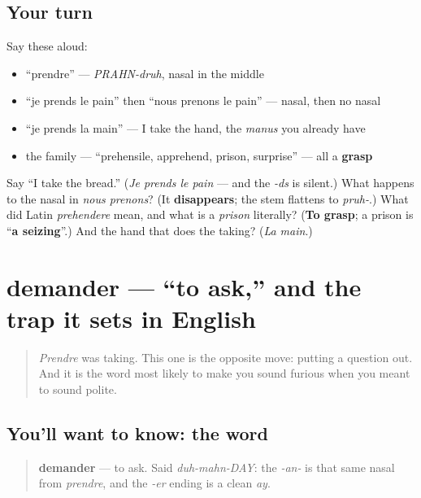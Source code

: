 \subsection*{Your turn}
Say these aloud:

\begin{itemize}
\raggedright
  \item \textquotedblleft{}prendre\textquotedblright{} — \emph{PRAHN-druh}, nasal in the middle
  \item \textquotedblleft{}je prends le pain\textquotedblright{} then \textquotedblleft{}nous prenons le pain\textquotedblright{} — nasal, then no nasal
  \item \textquotedblleft{}je prends la main\textquotedblright{} — I take the hand, the \emph{manus} you already have
  \item the family — \textquotedblleft{}prehensile, apprehend, prison, surprise\textquotedblright{} — all a \textbf{grasp}
\end{itemize}

\begin{tcolorbox}[breakable,colback=teal!4,colframe=teal!35!black,title={Before you move on}]
Say \textquotedblleft{}I take the bread.\textquotedblright{} (\emph{Je prends le pain} — and the \emph{-ds} is silent.) What happens to the nasal in \emph{nous prenons}? (It \textbf{disappears}; the stem flattens to \emph{pruh-}.) What did Latin \emph{prehendere} mean, and what is a \emph{prison} literally? (\textbf{To grasp}; a prison is \textquotedblleft{}\textbf{a seizing}\textquotedblright{}.) And the hand that does the taking? (\emph{La main}.)
\end{tcolorbox}
\section[demander]{demander — \textquotedblleft{}to ask,\textquotedblright{} and the trap it sets in English}

\label{lesson:FR-C24-demander}



\begin{quote}
\emph{Prendre} was taking. This one is the opposite move: putting a question out. And it is the word most likely to make you sound furious when you meant to sound polite.
\end{quote}

\subsection*{You'll want to know: the word}
\begin{quote}
\textbf{demander} — to ask. Said \emph{duh-mahn-DAY}: the \emph{-an-} is that same nasal from \emph{prendre}, and the \emph{-er} ending is a clean \emph{ay}.
\end{quote}

